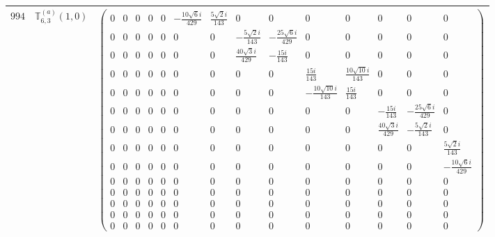 \documentclass[fleqn,8pt,landscape]{jsarticle}
\begin{document}
\begin{center}
\begin{longtable}{ccc}
$ 994 $ & $ \mathbb{T}_{6,3}^{(a)}(1,0) $ & $ \begin{pmatrix} 0 & 0 & 0 & 0 & 0 & - \frac{10 \sqrt{6} i}{429} & \frac{5 \sqrt{2} i}{143} & 0 & 0 & 0 & 0 & 0 & 0 & 0 \\ 0 & 0 & 0 & 0 & 0 & 0 & 0 & - \frac{5 \sqrt{2} i}{143} & - \frac{25 \sqrt{6} i}{429} & 0 & 0 & 0 & 0 & 0 \\ 0 & 0 & 0 & 0 & 0 & 0 & 0 & \frac{40 \sqrt{3} i}{429} & - \frac{15 i}{143} & 0 & 0 & 0 & 0 & 0 \\ 0 & 0 & 0 & 0 & 0 & 0 & 0 & 0 & 0 & \frac{15 i}{143} & \frac{10 \sqrt{10} i}{143} & 0 & 0 & 0 \\ 0 & 0 & 0 & 0 & 0 & 0 & 0 & 0 & 0 & - \frac{10 \sqrt{10} i}{143} & \frac{15 i}{143} & 0 & 0 & 0 \\ 0 & 0 & 0 & 0 & 0 & 0 & 0 & 0 & 0 & 0 & 0 & - \frac{15 i}{143} & - \frac{25 \sqrt{6} i}{429} & 0 \\ 0 & 0 & 0 & 0 & 0 & 0 & 0 & 0 & 0 & 0 & 0 & \frac{40 \sqrt{3} i}{429} & - \frac{5 \sqrt{2} i}{143} & 0 \\ 0 & 0 & 0 & 0 & 0 & 0 & 0 & 0 & 0 & 0 & 0 & 0 & 0 & \frac{5 \sqrt{2} i}{143} \\ 0 & 0 & 0 & 0 & 0 & 0 & 0 & 0 & 0 & 0 & 0 & 0 & 0 & - \frac{10 \sqrt{6} i}{429} \\ 0 & 0 & 0 & 0 & 0 & 0 & 0 & 0 & 0 & 0 & 0 & 0 & 0 & 0 \\ 0 & 0 & 0 & 0 & 0 & 0 & 0 & 0 & 0 & 0 & 0 & 0 & 0 & 0 \\ 0 & 0 & 0 & 0 & 0 & 0 & 0 & 0 & 0 & 0 & 0 & 0 & 0 & 0 \\ 0 & 0 & 0 & 0 & 0 & 0 & 0 & 0 & 0 & 0 & 0 & 0 & 0 & 0 \\ 0 & 0 & 0 & 0 & 0 & 0 & 0 & 0 & 0 & 0 & 0 & 0 & 0 & 0 \end{pmatrix} $ \\ \hline

\end{longtable}
\end{center}
\end{document}
